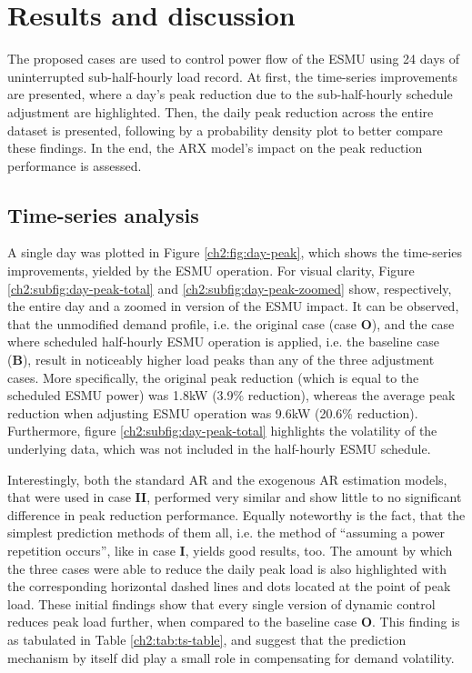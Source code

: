 \section{Results and discussion}
\label{ch2:sec:results}

The proposed cases are used to control power flow of the ESMU using 24 days of uninterrupted sub-half-hourly load record.
At first, the time-series improvements are presented, where a day's peak reduction due to the sub-half-hourly schedule adjustment are highlighted.
Then, the daily peak reduction across the entire dataset is presented, following by a probability density plot to better compare these findings.
In the end, the ARX model's impact on the peak reduction performance is assessed.

\subsection{Time-series analysis}



A single day was plotted in Figure \ref{ch2:fig:day-peak}, which shows the time-series improvements, yielded by the ESMU operation.
For visual clarity, Figure \ref{ch2:subfig:day-peak-total} and \ref{ch2:subfig:day-peak-zoomed} show, respectively, the entire day and a zoomed in version of the ESMU impact.
It can be observed, that the unmodified demand profile, i.e. the original case (case \textbf{O}), and the case where scheduled half-hourly ESMU operation is applied, i.e. the  baseline case (\textbf{B}), result in noticeably higher load peaks than any of the three adjustment cases.
More specifically, the original peak reduction (which is equal to the scheduled ESMU power) was 1.8kW (3.9\% reduction), whereas the average peak reduction when adjusting ESMU operation was 9.6kW (20.6\% reduction).
Furthermore, figure \ref{ch2:subfig:day-peak-total} highlights the volatility of the underlying data, which was not included in the half-hourly ESMU schedule.

Interestingly, both the standard AR and the exogenous AR estimation models, that were used in case \textbf{II}, performed very similar and show little to no significant difference in peak reduction performance.
Equally noteworthy is the fact, that the simplest prediction methods of them all, i.e. the method of ``assuming a power repetition occurs'', like in case \textbf{I}, yields good results, too.
The amount by which the three cases were able to reduce the daily peak load is also highlighted with the corresponding horizontal dashed lines and dots located at the point of peak load.
These initial findings show that every single version of dynamic control reduces peak load further, when compared to the baseline case \textbf{O}.
This finding is as tabulated in Table \ref{ch2:tab:ts-table}, and suggest that the prediction mechanism by itself did play a small role in compensating for demand volatility.

